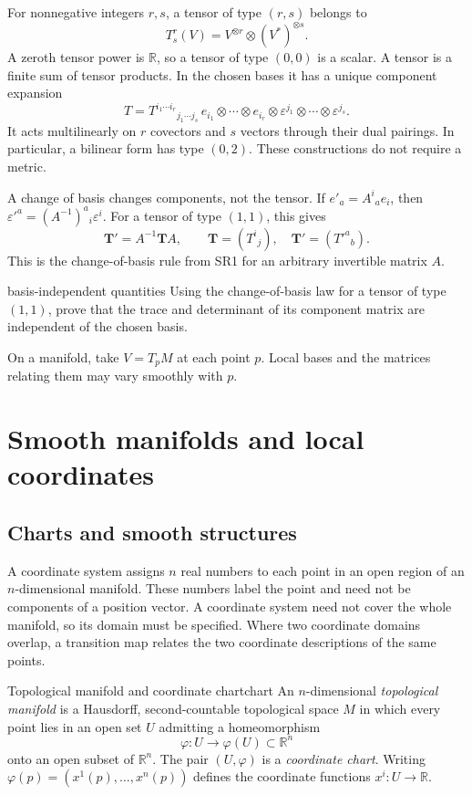 \documentclass[11pt,a4paper]{article}
\numberwithin{equation}{section}
\newcommand{\R}{\mathbb R}
\newcommand{\slideref}[1]{\par\nobreak\smallskip\nobreak{\footnotesize\color{ink!60}\textsc{Source slide #1}}\par\nobreak\smallskip\nobreak}
\begin{document}
For nonnegative integers \(r,s\), a tensor of type \((r,s)\) belongs to
\[
 T^r_s(V)=V^{\otimes r}\otimes(V^*)^{\otimes s}.
\]
A zeroth tensor power is \(\R\), so a tensor of type \((0,0)\) is a
scalar. A tensor is a finite sum of tensor products. In the chosen
bases it has a unique component expansion
\[
 T=T^{i_1\cdots i_r}{}_{j_1\cdots j_s}\,
 e_{i_1}\otimes\cdots\otimes e_{i_r}\otimes
 \varepsilon^{j_1}\otimes\cdots\otimes\varepsilon^{j_s}.
\]
It acts multilinearly on \(r\) covectors and \(s\) vectors through
their dual pairings. In particular, a bilinear form has type \((0,2)\).
These constructions do not require a metric.

A change of basis changes components, not the tensor. If
\(e'_a=A^i{}_a e_i\), then
\(\varepsilon'^a=(A^{-1})^a{}_i\varepsilon^i\). For a tensor of type
\((1,1)\), this gives
\[
 \mathbf T'=A^{-1}\mathbf T A,
 \qquad \mathbf T=(T^i{}_j),\quad \mathbf T'=(T'^a{}_b).
\]
This is the change-of-basis rule from SR1 for an arbitrary invertible
matrix \(A\).

\begin{studentwork}[6cm]{basis-independent quantities}
Using the change-of-basis law for a tensor of type \((1,1)\),
prove that the trace and determinant of its component matrix
are independent of the chosen basis.
\end{studentwork}

On a manifold, take \(V=T_pM\) at each point \(p\). Local bases and
the matrices relating them may vary smoothly with \(p\).

\section{Smooth manifolds and local coordinates}
\label{sec:manifolds}
\slideref{5}

\subsection{Charts and smooth structures}

A coordinate system assigns \(n\) real numbers to each point in an open
region of an \(n\)-dimensional manifold. These numbers label the point
and need not be components of a position vector. A coordinate system
need not cover the whole manifold, so its domain must be specified.
Where two coordinate domains overlap, a transition map relates the
two coordinate descriptions of the same points.

\begin{definition}{Topological manifold and coordinate chart}{chart}
An \(n\)-dimensional \emph{topological manifold} is a Hausdorff,
second-countable topological space \(M\) in which every point lies in
an open set \(U\) admitting a homeomorphism
\[
 \varphi:U\longrightarrow\varphi(U)\subset\R^n
\]
onto an open subset of \(\R^n\). The pair \((U,\varphi)\) is a
\emph{coordinate chart}. Writing
\(\varphi(p)=(x^1(p),\ldots,x^n(p))\) defines the coordinate functions
\(x^i:U\to\R\).
\end{definition}
\end{document}
